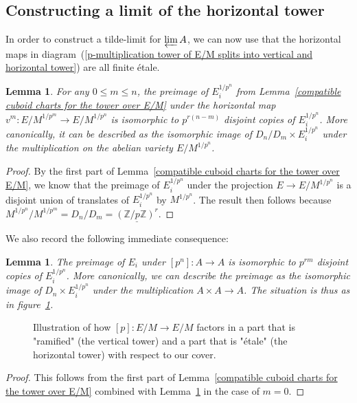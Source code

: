 \documentclass[11pt,oneside]{amsart}
\newtheorem{lemma}[theorem]{Lemma}
\theoremstyle{definition}
\theoremstyle{remark}
\begin{document}
	\subsection{Constructing a limit of the horizontal tower}
	In order to construct a tilde-limit for $\varprojlim A$, we can now use that the horizontal maps in diagram~(\ref{p-multiplication tower of E/M splits into vertical and horizontal tower}) are all finite \'etale.
	\begin{lemma}\label{horizontal map is covering map}
		For any $0\leq m\leq n$, the preimage of $E_i^{1/p^n}$ from Lemma~\ref{compatible cuboid charts for the tower over E/M} under the horizontal map $v^m:E/M^{1/p^{m}}\rightarrow E/M^{1/p^n}$ is isomorphic to $p^{r(n-m)}$ disjoint copies of $E_i^{1/p^n}$. More canonically, it can be described as the isomorphic image of $D_n/D_{m}\times E_i^{1/p^n}$ under the multiplication on the abelian variety $E/M^{1/p^n}$.
	\end{lemma}
	\begin{proof}
		By the first part of Lemma~\ref{compatible cuboid charts for the tower over E/M}, we know that the preimage of $E_i^{1/p^n}$ under the projection $E\rightarrow E/M^{1/p^n}$ is a disjoint union of translates of $E_i^{1/p^n}$ by $M^{1/p^{n}}$. The result then follows because $M^{1/p^{n}}/M^{1/p^{m}} = D_n/D_m =  \underline{(\mathbb Z/p\mathbb Z)^r}$.
	\end{proof}
	We also record the following immediate consequence:
	
	\begin{lemma}\label{preimage of E_i under p^n is disjoint copies}
		The preimage of $E_i$ under $[p^n]:A\rightarrow A$ is isomorphic to $p^{rm}$ disjoint copies of $E_i^{1/p^n}$. More canonically, we can describe the preimage as the isomorphic image of  $D_n \times E_i^{1/p^n}$ under the multiplication $A\times A\rightarrow A$. The situation is thus as in figure~\ref{local-glueing-[p]-tikzpicture}.
	\end{lemma}
	\begin{figure}
		
		\caption{Illustration of how $[p]:E/M\rightarrow E/M$ factors in a part that is "ramified" (the vertical tower) and a part that is "\'etale" (the horizontal tower) with respect to our cover.}
		\label{local-glueing-[p]-tikzpicture}
	\end{figure}
	\begin{proof}
		This follows from the first part of Lemma~\ref{compatible cuboid charts for the tower over E/M} combined with Lemma~\ref{horizontal map is covering map} in the case of $m=0$.
	\end{proof}
	
\end{document}
